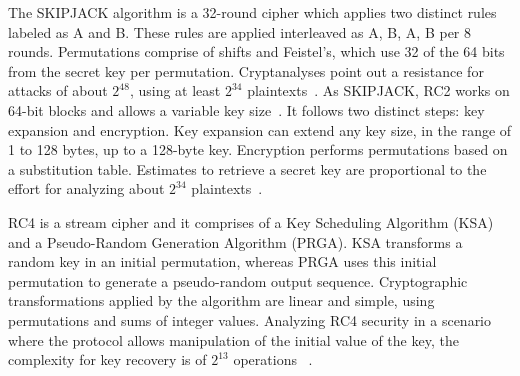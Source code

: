The SKIPJACK algorithm is a 32-round cipher which applies two distinct rules labeled as A and B. These rules are applied interleaved as A, B, A, B per 8 rounds. Permutations comprise of shifts and Feistel's, which use 32 of the 64 bits from the secret key per permutation. %
Cryptanalyses point out a resistance for attacks of about $2^{48}$, using at least $2^{34}$ plaintexts~\cite{Moh:2015}. %
%
As SKIPJACK, RC2 works on 64-bit blocks and allows a variable key size~\cite{knudsen1998design}. 
It follows two distinct steps: key expansion and encryption. Key expansion can extend any key size, in the range of 1 to 128 bytes, up to a 128-byte key. Encryption performs permutations based on %
a substitution table. %
Estimates to retrieve a secret key are proportional to the effort for analyzing about $2^{34}$ plaintexts~\cite{Moh:2015}.

RC4 is a stream cipher and  
it comprises of %
a Key Scheduling Algorithm (KSA) and a Pseudo-Random Generation Algorithm (PRGA). KSA transforms a random key in an initial permutation, whereas PRGA %
uses this initial permutation to generate a pseudo-random output sequence. Cryptographic transformations applied by the algorithm are linear and simple, using permutations and sums of integer values. %
Analyzing RC4 security in a scenario where the protocol allows manipulation of the initial value of the key, the complexity for key recovery is of $2^{13}$ operations%
~\cite{orumiehchiha2013cryptanalysis}.

